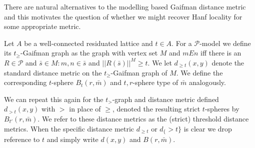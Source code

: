 \documentclass{lmcs} %
\newcommand{\?}{\ensuremath{\mkern0.4\thinmuskip}}
\newcommand{\CP}{\mathcal{P}}
\begin{document}
There are natural alternatives to the modelling based Gaifman distance metric and this motivates the question of whether we might recover Hanf locality for some appropriate metric.
\begin{defi}
    Let $A$ be a well-connected residuated lattice and $t\in A$. For a $\CP$-model we define its $t_\geq$-Gaifman graph as the graph with vertex set $M$ and $mEn$ iff there is an $R\in\CP$ and $\bar{s}\in M:m,n\in\bar{s}$ and $||R(\bar{s})||^M\geq t$. We let $d_{\geq t}(x,y)$ denote the standard distance metric on the $t_\geq$-Gaifman graph of $M$. We define the corresponding $t$-sphere $B_t(r,\bar{m})$ and $t,r$-sphere type of $\bar{m}$ analogously.

    We can repeat this again for the $t_>$-graph and distance metric defined $d_{>t}(x,y)$ with $>$ in place of $\geq$, denoted the resulting strict $t$-spheres by $B_{t'}(r,\bar{m})$. We refer to these distance metrics as the (strict) threshold distance metrics. When the specific distance metric $d_{\geq t}$ or $d_\{>t\}$ is clear we drop reference to $t$ and simply write $d(x,y)$ and $B(r,\bar{m})$. 
\end{defi}
\end{document}
